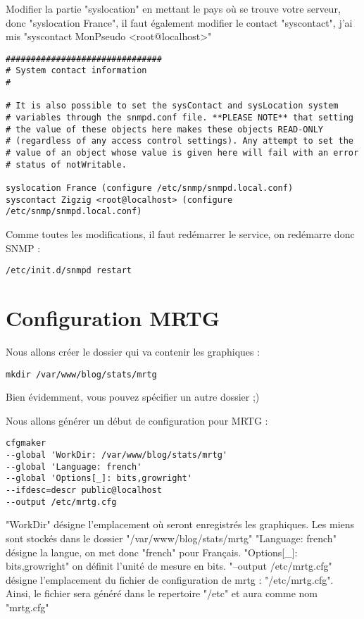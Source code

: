 Modifier la partie "syslocation" en mettant le pays où se trouve votre serveur, donc "syslocation France", il faut également modifier le contact "syscontact", j'ai mis "syscontact MonPseudo <root@localhost>"

\begin{verbatim}
###############################
# System contact information
#

# It is also possible to set the sysContact and sysLocation system
# variables through the snmpd.conf file. **PLEASE NOTE** that setting
# the value of these objects here makes these objects READ-ONLY
# (regardless of any access control settings). Any attempt to set the
# value of an object whose value is given here will fail with an error
# status of notWritable.

syslocation France (configure /etc/snmp/snmpd.local.conf)
syscontact Zigzig <root@localhost> (configure /etc/snmp/snmpd.local.conf)
\end{verbatim}

Comme toutes les modifications, il faut redémarrer le service, on redémarre donc SNMP :
\begin{verbatim}
/etc/init.d/snmpd restart
\end{verbatim}

\section{Configuration MRTG}

Nous allons créer le dossier qui va contenir les graphiques :

\begin{verbatim}
mkdir /var/www/blog/stats/mrtg
\end{verbatim}


Bien évidemment, vous pouvez spécifier un autre dossier ;)

Nous allons générer un début de configuration pour MRTG :

\begin{verbatim}
cfgmaker 
--global 'WorkDir: /var/www/blog/stats/mrtg' 
--global 'Language: french' 
--global 'Options[_]: bits,growright' 
--ifdesc=descr public@localhost 
--output /etc/mrtg.cfg
\end{verbatim}


"WorkDir" désigne l'emplacement où seront enregistrés les graphiques. Les miens sont stockés dans le dossier "/var/www/blog/stats/mrtg"
"Language: french" désigne la langue, on met donc "french" pour Français.
"Options[\_]: bits,growright" on définit l'unité de mesure en bits.
"--output /etc/mrtg.cfg" désigne l'emplacement du fichier de configuration de mrtg : "/etc/mrtg.cfg". Ainsi, le fichier sera généré dans le repertoire "/etc" et aura comme nom "mrtg.cfg"

